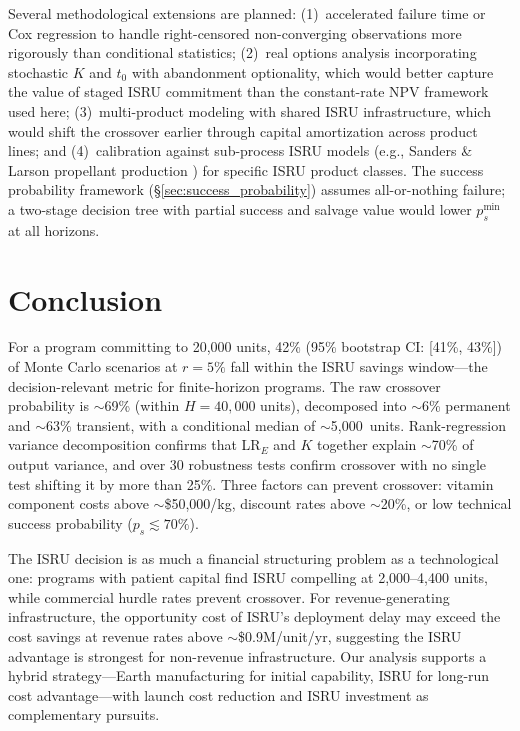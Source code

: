 \documentclass[preprint,12pt]{elsarticle}
\begin{document}
Several methodological extensions are planned: (1)~accelerated failure time or Cox regression to handle right-censored non-converging observations more rigorously than conditional statistics; (2)~real options analysis incorporating stochastic $K$ and $t_0$ with abandonment optionality, which would better capture the value of staged ISRU commitment than the constant-rate NPV framework used here; (3)~multi-product modeling with shared ISRU infrastructure, which would shift the crossover earlier through capital amortization across product lines; and (4)~calibration against sub-process ISRU models (e.g., Sanders \& Larson propellant production \cite{sanders2015}) for specific ISRU product classes. The success probability framework (\S\ref{sec:success_probability}) assumes all-or-nothing failure; a two-stage decision tree with partial success and salvage value would lower $p_s^{\min}$ at all horizons.

\section{Conclusion}
\label{sec:conclusion}

For a program committing to 20{,}000 units, 42\% (95\% bootstrap CI: [41\%, 43\%]) of Monte Carlo scenarios at $r = 5\%$ fall within the ISRU savings window---the decision-relevant metric for finite-horizon programs. The raw crossover probability is ${\sim}$69\% (within $H = 40{,}000$ units), decomposed into ${\sim}$6\% permanent and ${\sim}$63\% transient, with a conditional median of $\sim$5{,}000~units. Rank-regression variance decomposition confirms that LR$_E$ and $K$ together explain ${\sim}$70\% of output variance, and over 30 robustness tests confirm crossover with no single test shifting it by more than 25\%. Three factors can prevent crossover: vitamin component costs above ${\sim}$\$50{,}000/kg, discount rates above ${\sim}$20\%, or low technical success probability ($p_s \lesssim 70\%$).

The ISRU decision is as much a financial structuring problem as a technological one: programs with patient capital find ISRU compelling at 2{,}000--4{,}400 units, while commercial hurdle rates prevent crossover. For revenue-generating infrastructure, the opportunity cost of ISRU's deployment delay may exceed the cost savings at revenue rates above ${\sim}$\$0.9M/unit/yr, suggesting the ISRU advantage is strongest for non-revenue infrastructure. Our analysis supports a hybrid strategy---Earth manufacturing for initial capability, ISRU for long-run cost advantage---with launch cost reduction and ISRU investment as complementary pursuits.
\end{document}
